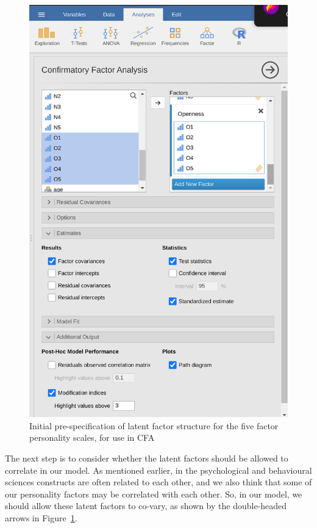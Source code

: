 \documentclass[
  a4paper,
]{book}
\begin{document}
\begin{figure}

\includegraphics[width=1\textwidth,height=\textheight]{images/fig15-13.png} \hfill{}

\caption{\label{fig-fig15-13}Initial pre-specification of latent factor
structure for the five factor personality scales, for use in CFA}

\end{figure}

The next step is to consider whether the latent factors should be
allowed to correlate in our model. As mentioned earlier, in the
psychological and behavioural sciences constructs are often related to
each other, and we also think that some of our personality factors may
be correlated with each other. So, in our model, we should allow these
latent factors to co-vary, as shown by the double-headed arrows in
Figure~\ref{fig-fig15-13}.
\end{document}
